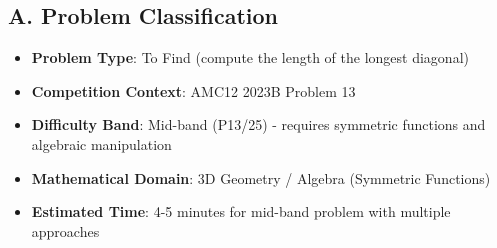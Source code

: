 \documentclass[12pt]{article}
\begin{document}
\begin{problemconfigbox}
\subsection*{A. Problem Classification}
\begin{itemize}[leftmargin=*]
    \item \textbf{Problem Type}: To Find (compute the length of the longest diagonal)
    \item \textbf{Competition Context}: AMC12 2023B Problem 13
    \item \textbf{Difficulty Band}: Mid-band (P13/25) - requires symmetric functions and algebraic manipulation
    \item \textbf{Mathematical Domain}: 3D Geometry / Algebra (Symmetric Functions)
    \item \textbf{Estimated Time}: 4-5 minutes for mid-band problem with multiple approaches
\end{itemize}


\end{problemconfigbox}
\end{document}
